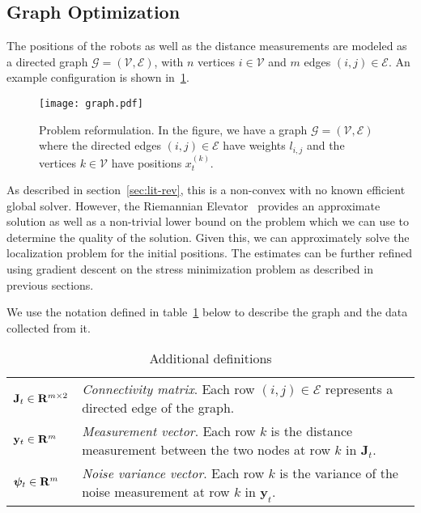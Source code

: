 \subsection{Graph Optimization} \label{sec:graphs}
The positions of the robots as well as the distance measurements are modeled as a directed graph $\mathcal{G} = (\mathcal{V}, \mathcal{E})$, with $n$ vertices $i \in \mathcal{V}$ and $m$ edges $(i, j) \in \mathcal{E}$. An example configuration is shown in~\ref{fig:problem-graph}.
\begin{figure}[ht]
    \centering
    \texttt{[image: graph.pdf]}
    \caption{Problem reformulation. In the figure, we have a graph $\mathcal{G}=(\mathcal{V}, \mathcal{E})$ where the directed edges $(i, j) \in \mathcal{E}$ have weights $l_{i,j}$ and the vertices $k \in \mathcal{V}$ have positions $x^{(k)}_t$.}
    \label{fig:problem-graph} 
\end{figure}
As described in section~\ref{sec:lit-rev}, this is a non-convex with no known efficient global solver. However, the Riemannian Elevator~\cite{R_elevator} provides an approximate solution as well as a non-trivial lower bound on the problem which we can use to determine the quality of the solution. Given this, we can approximately solve the localization problem for the initial positions. The estimates can be further refined using gradient descent on the stress minimization problem as described in previous sections. 

We use the notation defined in table~\ref{tab:notation} below to describe the graph and the data collected from it.
\FloatBarrier
\begin{table}[ht]
    \centering
    \caption{Additional definitions}
    \label{tab:notation}
    \begin{tabularx}{\linewidth}{lX}
        $\mathbf{J}_t \in \mathbf{R}^{m \times 2}$ & 
        \textit{Connectivity matrix}.  Each row $(i, j)\in\mathcal{E}$ represents a directed edge of the graph. \\
        $\mathbf{y}_t \in \mathbf{R}^{m}$ & 
        \textit{Measurement vector}. Each row $k$ is the distance measurement between the two nodes at row $k$ in $\mathbf{J}_t$. \\
        $\bm{\psi}_t \in \mathbf{R}^{m}$ &
        \textit{Noise variance vector}. Each row $k$ is the variance of the noise measurement at row $k$ in $\mathbf{y}_t$. 
    \end{tabularx}
\end{table}


